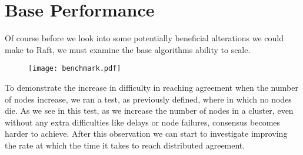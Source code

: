 \section{Base Performance}

Of course before we look into some potentially beneficial alterations we could make to Raft, we must examine the base algorithms ability to scale.

\begin{figure}[h]
\centering
\texttt{[image: benchmark.pdf]}
\end{figure}

To demonstrate the increase in difficulty in reaching agreement when the number of nodes increase, we ran a test, as previously defined, where in which no nodes die. As we see in this test, as we increase the number of nodes in a cluster, even without any extra difficulties like delays or node failures, consensus becomes harder to achieve. After this observation we can start to investigate improving the rate at which the time it takes to reach distributed agreement.